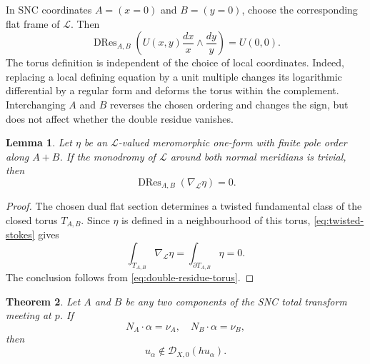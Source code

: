 \documentclass[12pt]{amsart}
\numberwithin{equation}{section}
\theoremstyle{plain}
\newtheorem{theorem}{Theorem}[section]
\newtheorem{lemma}[theorem]{Lemma}
\theoremstyle{definition}
\theoremstyle{remark}
\theoremstyle{definition}
\DeclareMathOperator{\DRes}{DRes}
\newcommand{\D}{\mathscr D}
\newcommand{\Lcal}{\mathscr L}
\begin{document}
In SNC coordinates $A=(x=0)$ and $B=(y=0)$, choose the corresponding flat frame of $\Lcal$. Then
\begin{equation}\label{eq:double-residue-coordinate}
\DRes_{A,B}\left(U(x,y)\frac{dx}{x}\wedge\frac{dy}{y}\right)=U(0,0).
\end{equation}
The torus definition is independent of the choice of local coordinates. Indeed, replacing a local defining equation by a unit multiple changes its logarithmic differential by a regular form and deforms the torus within the complement. Interchanging $A$ and $B$ reverses the chosen ordering and changes the sign, but does not affect whether the double residue vanishes.


\begin{lemma}\label{lem:exact-double-residue}
Let $\eta$ be an $\Lcal$-valued meromorphic one-form with finite pole order along $A+B$. If the monodromy of $\Lcal$ around both normal meridians is trivial, then
\begin{equation}\label{eq:exact-double-residue-zero}
\DRes_{A,B}(\nabla_{\Lcal}\eta)=0.
\end{equation}
\end{lemma}

\begin{proof}
The chosen dual flat section determines a twisted fundamental class of the closed torus $T_{A,B}$. Since $\eta$ is defined in a neighbourhood of this torus, \eqref{eq:twisted-stokes} gives
\begin{equation*}
\int_{T_{A,B}}\nabla_{\Lcal}\eta=\int_{\partial T_{A,B}}\eta=0.
\end{equation*}
The conclusion follows from \eqref{eq:double-residue-torus}.
\end{proof}


\begin{theorem}
\label{thm:direct-double-residue-obstruction}
Let $A$ and $B$ be any two components of the SNC total transform meeting at $p$. If
\begin{equation}\label{eq:two-wall-equalities}
 N_A\cdot\alpha=\nu_A,
 \quad
 N_B\cdot\alpha=\nu_B,
\end{equation}
then
\[
 u_\alpha\notin\D_{X,0}(hu_\alpha).
\]
\end{theorem}
\end{document}
